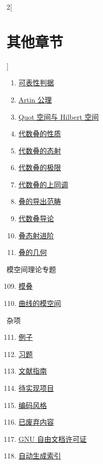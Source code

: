 \begin{multicols}{2}[\section{其他章节}]
\begin{enumerate}
\item \hyperref[criteria-section-phantom]{可表性判据}
\item \hyperref[artin-section-phantom]{Artin 公理}
\item \hyperref[quot-section-phantom]{Quot 空间与 Hilbert 空间}
\item \hyperref[stacks-properties-section-phantom]{代数叠的性质}
\item \hyperref[stacks-morphisms-section-phantom]{代数叠的态射}
\item \hyperref[stacks-limits-section-phantom]{代数叠的极限}
\item \hyperref[stacks-cohomology-section-phantom]{代数叠的上同调}
\item \hyperref[stacks-perfect-section-phantom]{叠的导出范畴}
\item \hyperref[stacks-introduction-section-phantom]{代数叠导论}
\item \hyperref[stacks-more-morphisms-section-phantom]{叠态射进阶}
\item \hyperref[stacks-geometry-section-phantom]{叠的几何}
\end{enumerate}
模空间理论专题
\begin{enumerate}
\setcounter{enumi}{108}
\item \hyperref[moduli-section-phantom]{模叠}
\item \hyperref[moduli-curves-section-phantom]{曲线的模空间}
\end{enumerate}
杂项
\begin{enumerate}
\setcounter{enumi}{110}
\item \hyperref[examples-section-phantom]{例子}
\item \hyperref[exercises-section-phantom]{习题}
\item \hyperref[guide-section-phantom]{文献指南}
\item \hyperref[desirables-section-phantom]{待实现项目}
\item \hyperref[coding-section-phantom]{编码风格}
\item \hyperref[obsolete-section-phantom]{已废弃内容}
\item \hyperref[fdl-section-phantom]{GNU 自由文档许可证}
\item \hyperref[index-section-phantom]{自动生成索引}
\end{enumerate}
\end{multicols}
